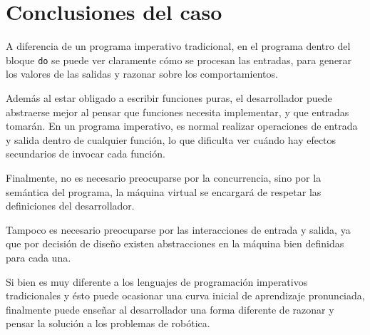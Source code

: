 




\section {Conclusiones del caso}

  A diferencia de un programa imperativo tradicional, en el programa
\frob{} dentro del bloque \texttt{do} se puede ver claramente cómo
se procesan las entradas, para generar los valores de las salidas y
razonar sobre los comportamientos.

  Además al estar obligado a escribir funciones puras, el desarrollador
puede abstraerse mejor al pensar que funciones necesita implementar,
y que entradas tomarán. En un programa imperativo, es normal realizar
operaciones de entrada y salida dentro de cualquier función, lo que
dificulta ver cuándo hay efectos secundarios de invocar cada función.

  Finalmente, no es necesario preocuparse por la concurrencia, sino
por la semántica del programa, la máquina virtual se encargará de
respetar las definiciones del desarrollador.

  Tampoco es necesario preocuparse por las interacciones de entrada
y salida, ya que por decisión de diseño existen abstracciones en
la máquina bien definidas para cada una.

  Si bien \frob{} es muy diferente a los lenguajes de
programación imperativos tradicionales y ésto puede ocasionar una
curva inicial de aprendizaje pronunciada, finalmente puede enseñar al
desarrollador una forma diferente de razonar y pensar la solución
a los problemas de robótica.


